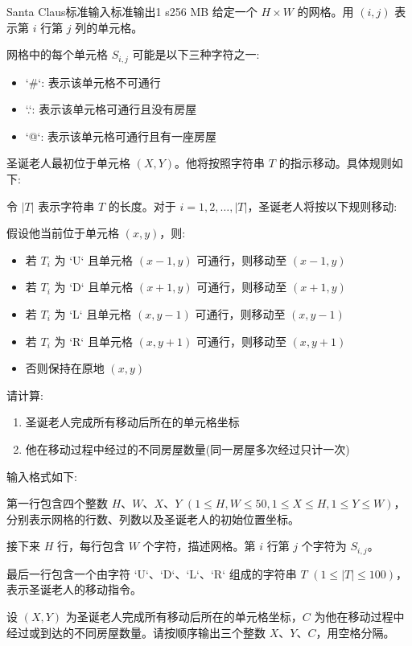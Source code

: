 \begin{problem}{Santa Claus}{标准输入}{标准输出}{1 s}{256 MB}
给定一个 $H \times W$ 的网格。用 $(i,j)$ 表示第 $i$ 行第 $j$ 列的单元格。

网格中的每个单元格 $S_{i,j}$ 可能是以下三种字符之一:
\begin{itemize}
\item `\#`: 表示该单元格不可通行
\item `.`: 表示该单元格可通行且没有房屋
\item `@`: 表示该单元格可通行且有一座房屋
\end{itemize}

圣诞老人最初位于单元格 $(X,Y)$。他将按照字符串 $T$ 的指示移动。具体规则如下:

令 $|T|$ 表示字符串 $T$ 的长度。对于 $i=1,2,\ldots,|T|$，圣诞老人将按以下规则移动:

假设他当前位于单元格 $(x,y)$，则:
\begin{itemize}
\item 若 $T_i$ 为 `U` 且单元格 $(x-1,y)$ 可通行，则移动至 $(x-1,y)$
\item 若 $T_i$ 为 `D` 且单元格 $(x+1,y)$ 可通行，则移动至 $(x+1,y)$
\item 若 $T_i$ 为 `L` 且单元格 $(x,y-1)$ 可通行，则移动至 $(x,y-1)$
\item 若 $T_i$ 为 `R` 且单元格 $(x,y+1)$ 可通行，则移动至 $(x,y+1)$
\item 否则保持在原地 $(x,y)$
\end{itemize}

请计算:
\begin{enumerate}
\item 圣诞老人完成所有移动后所在的单元格坐标
\item 他在移动过程中经过的不同房屋数量(同一房屋多次经过只计一次)
\end{enumerate}

\InputFile
输入格式如下:

第一行包含四个整数 $H$、$W$、$X$、$Y$ $(1 \leq H,W \leq 50, 1 \leq X \leq H, 1 \leq Y \leq W)$，分别表示网格的行数、列数以及圣诞老人的初始位置坐标。

接下来 $H$ 行，每行包含 $W$ 个字符，描述网格。第 $i$ 行第 $j$ 个字符为 $S_{i,j}$。

最后一行包含一个由字符 `U`、`D`、`L`、`R` 组成的字符串 $T$ $(1 \leq |T| \leq 100)$，表示圣诞老人的移动指令。

\OutputFile
设 $(X,Y)$ 为圣诞老人完成所有移动后所在的单元格坐标，$C$ 为他在移动过程中经过或到达的不同房屋数量。请按顺序输出三个整数 $X$、$Y$、$C$，用空格分隔。


\end{problem}
